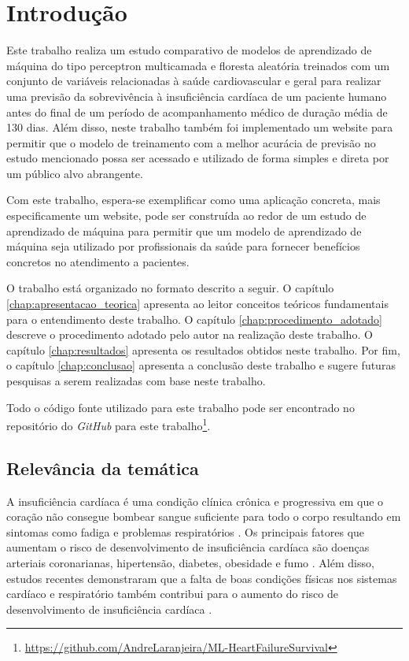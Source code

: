 \chapter{Introdução} \label{chap:introducao}

Este trabalho realiza um estudo comparativo de modelos de aprendizado de máquina do tipo perceptron multicamada e floresta aleatória treinados com um conjunto de variáveis relacionadas à saúde cardiovascular e geral para realizar uma previsão da sobrevivência à insuficiência cardíaca de um paciente humano antes do final de um período de acompanhamento médico de duração média de 130 dias. Além disso, neste trabalho também foi implementado um website para permitir que o modelo de treinamento com a melhor acurácia de previsão no estudo mencionado possa ser acessado e utilizado de forma simples e direta por um público alvo abrangente.

Com este trabalho, espera-se exemplificar como uma aplicação concreta, mais especificamente um website, pode ser construída ao redor de um estudo de aprendizado de máquina para permitir que um modelo de aprendizado de máquina seja utilizado por profissionais da saúde para fornecer benefícios concretos no atendimento a pacientes.

O trabalho está organizado no formato descrito a seguir. O capítulo \ref{chap:apresentacao_teorica} apresenta ao leitor conceitos teóricos fundamentais para o entendimento deste trabalho. O capítulo \ref{chap:procedimento_adotado} descreve o procedimento adotado pelo autor na realização deste trabalho. O capítulo \ref{chap:resultados} apresenta os resultados obtidos neste trabalho. Por fim, o capítulo \ref{chap:conclusao} apresenta a conclusão deste trabalho e sugere futuras pesquisas a serem realizadas com base neste trabalho.

Todo o código fonte utilizado para este trabalho pode ser encontrado no repositório do \textit{GitHub} para este trabalho\footnote{\url{https://github.com/AndreLaranjeira/ML-HeartFailureSurvival}}.

\section{Relevância da temática}

A insuficiência cardíaca é uma condição clínica crônica e progressiva em que o coração não consegue bombear sangue suficiente para todo o corpo resultando em sintomas como fadiga e problemas respiratórios \cite{heart_failure_definition}. Os principais fatores que aumentam o risco de desenvolvimento de insuficiência cardíaca são doenças arteriais coronarianas, hipertensão, diabetes, obesidade e fumo \cite[p.399]{heart_disease2021}. Além disso, estudos recentes demonstraram que a falta de boas condições físicas nos sistemas cardíaco e respiratório também contribui para o aumento do risco de desenvolvimento de insuficiência cardíaca \cite[p.62]{heart_disease2021}.

